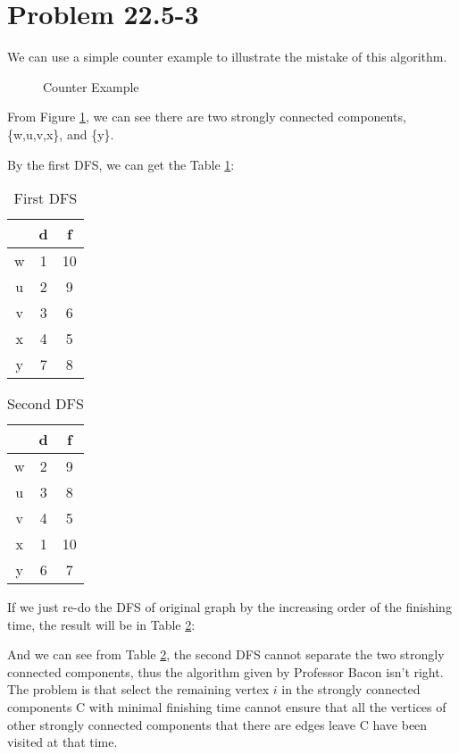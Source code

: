 \documentclass[oneside]{homework} %
\begin{document}
\maketitle
\newpage
\section {Problem 22.5-3} 
We can use a simple counter example to illustrate the mistake of this algorithm.
\begin{figure}[h]
  \centering
  \caption{Counter Example}
  \label{fig:ce}
\end{figure}

From Figure \ref {fig:ce}, we can see there are two strongly connected components,\{w,u,v,x\}, and \{y\}.

By the first DFS, we can get the Table \ref{tlb:ce}:

\begin{table}[h]
\centering
  \begin{tabular}{c|c|c}
	& d & f \\
	\hline
	w & 1 & 10 \\
	\hline
	u & 2 & 9 \\
	\hline
	v & 3 & 6 \\
	\hline
	x & 4 & 5 \\
	\hline
	y & 7 & 8 \\
  \end{tabular}
\caption{First DFS}
\label{tlb:ce}
\end{table}

\begin{table}[h]
\centering
  \begin{tabular}{c|c|c}
	& d & f \\
	\hline
	w & 2 & 9 \\
	\hline
	u & 3 & 8 \\
	\hline
	v & 4 & 5 \\
	\hline
	x & 1 & 10 \\
	\hline
	y & 6 & 7 \\
  \end{tabular}
  \caption{Second DFS}
  \label{tlb:ce2}
\end{table}



If we just re-do the DFS of original graph by the increasing order of the finishing time, the result will be in Table \ref{tlb:ce2}:


And we can see from Table \ref{tlb:ce2}, the second DFS cannot separate the two strongly connected components, thus the algorithm given by Professor Bacon isn't right. The problem is that select the remaining vertex $\mathit{i}$ in the strongly connected components C with minimal finishing time cannot ensure that all the vertices of other strongly connected components that there are edges leave C have been visited at that time.
\end{document}
